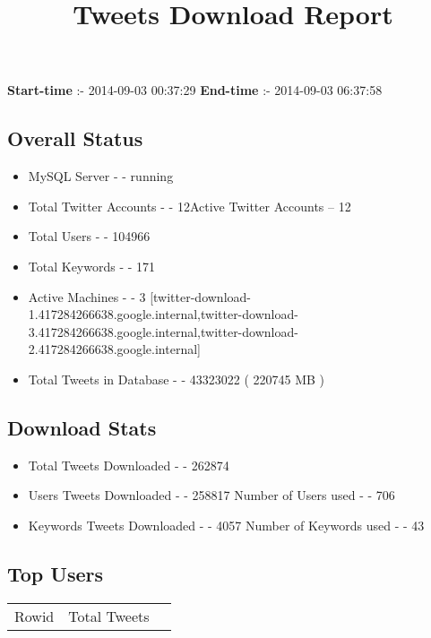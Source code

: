 \documentclass{article}\usepackage[T1]{fontenc}
\begin{document}
\title{\textbf{Tweets Download Report}}
               \date{}
                \maketitle
               \centerline{\textbf{Start-time} :- 2014-09-03 00:37:29 \hspace{40pt} \textbf{End-time} :- 2014-09-03 06:37:58}               \subsection*{Overall Status}                \begin{itemize}                \item MySQL Server - - running               \item Total Twitter Accounts - - 12\newline Active Twitter Accounts -- 12               \item Total Users - - 104966               \item Total Keywords - - 171               \item Active Machines - - 3 [twitter-download-1.417284266638.google.internal,twitter-download-3.417284266638.google.internal,twitter-download-2.417284266638.google.internal]               \item Total Tweets in Database - - 43323022 ( 220745 MB )               \end{itemize}               \subsection*{Download Stats}                \begin{itemize}                \item Total Tweets Downloaded - - 262874               \item Users Tweets Downloaded - - 258817 \newline Number of Users used - - 706               \item Keywords Tweets Downloaded - - 4057 \newline Number of Keywords used - - 43              \end{itemize}              \subsection*{Top Users}\begin{tabular}{|c|c|c|}         \hline         Rowid & Total Tweets \\ 

\end{tabular}
\end{document}
